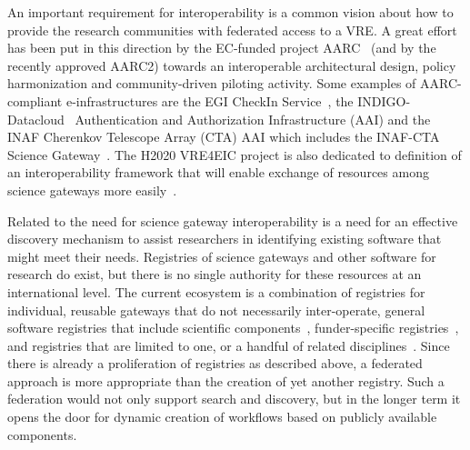 \documentclass[review]{elsarticle}
\begin{document}
An important requirement for  interoperability is a common vision about how to provide the research communities with federated access to a VRE. A great effort has been put in this direction by the EC-funded project AARC~\cite{aarc-50} (and by the recently approved  AARC2) towards an interoperable architectural design, policy harmonization and community-driven piloting activity. Some examples of AARC-compliant e-infrastructures are the EGI CheckIn Service~\cite{aai-51}, the  INDIGO-Datacloud~\cite{indigo-52} Authentication and Authorization Infrastructure (AAI)  and the INAF Cherenkov Telescope Array (CTA) AAI which includes the INAF-CTA Science Gateway~\cite{Costa2015-53}. The H2020 VRE4EIC project is also dedicated to definition of an interoperability framework that will enable exchange of resources among science gateways more easily~\cite{vre4eic-21}.

Related to the need for science gateway interoperability is a need for an effective discovery mechanism to assist researchers in identifying existing software that might meet their needs. Registries of science gateways and other software for research do exist, but there is no single authority for these resources at an international level. The current ecosystem is a combination of registries for individual, reusable gateways \cite{alces-54, hubzero-55} that do not necessarily inter-operate, general software registries that include scientific components~\cite{github-56,openhatch-57}, funder-specific registries~\cite{canarie-58}, and registries that are limited to one, or a handful of related disciplines~\cite{iplant-59,cyverse-60}. Since there is already a proliferation of registries as described above, a federated approach is more appropriate than the creation of yet another registry. Such a federation would not only support search and discovery, but in the longer term it opens the door for dynamic creation of workflows based on publicly available components.
\end{document}
